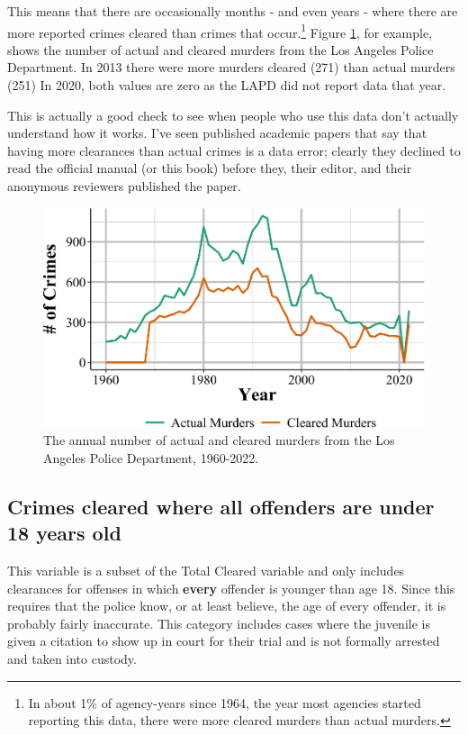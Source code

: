 \documentclass[
  12pt,
  openany]{book}
\begin{document}
This means that there are occasionally months - and even years - where there are more reported crimes cleared than crimes that occur.\footnote{In about 1\% of agency-years since 1964, the year most agencies started reporting this data, there were more cleared murders than actual murders.} Figure \ref{fig:lapdClearance}, for example, shows the number of actual and cleared murders from the Los Angeles Police Department. In 2013 there were more murders cleared (271) than actual murders (251) In 2020, both values are zero as the LAPD did not report data that year.

This is actually a good check to see when people who use this data don't actually understand how it works. I've seen published academic papers that say that having more clearances than actual crimes is a data error; clearly they declined to read the official manual (or this book) before they, their editor, and their anonymous reviewers published the paper.

\begin{figure}

{\centering \includegraphics[width=0.9\linewidth]{03_offenses_known_files/figure-latex/lapdClearance-1} 

}

\caption{The annual number of actual and cleared murders from the Los Angeles Police Department, 1960-2022.}\label{fig:lapdClearance}
\end{figure}

\subsection{Crimes cleared where all offenders are under 18 years old}\label{crimes-cleared-where-all-offenders-are-under-18-years-old}

This variable is a subset of the Total Cleared variable and only includes clearances for offenses in which \textbf{every} offender is younger than age 18. Since this requires that the police know, or at least believe, the age of every offender, it is probably fairly inaccurate. This category includes cases where the juvenile is given a citation to show up in court for their trial and is not formally arrested and taken into custody.
\end{document}
